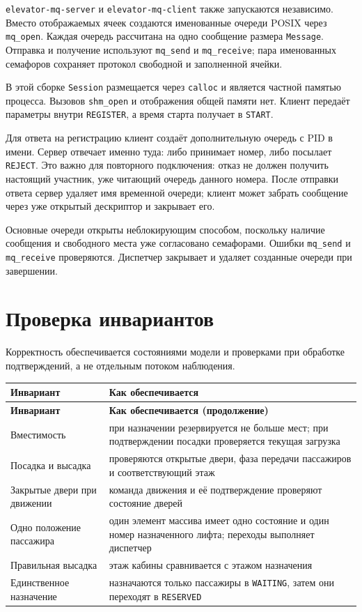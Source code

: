\documentclass[12pt,a4paper]{article}
\begin{document}
\verb|elevator-mq-server| и \verb|elevator-mq-client| также запускаются
независимо. Вместо отображаемых ячеек создаются именованные очереди
POSIX через \verb|mq_open|. Каждая очередь рассчитана на одно сообщение
размера \verb|Message|. Отправка и получение используют \verb|mq_send|
и \verb|mq_receive|; пара именованных семафоров сохраняет протокол
свободной и заполненной ячейки.

В этой сборке \verb|Session| размещается через \verb|calloc| и является
частной памятью процесса. Вызовов \verb|shm_open| и отображения общей
памяти нет. Клиент передаёт параметры внутри \verb|REGISTER|, а время
старта получает в \verb|START|.

Для ответа на регистрацию клиент создаёт дополнительную очередь с PID
в имени. Сервер отвечает именно туда: либо принимает номер, либо
посылает \verb|REJECT|. Это важно для повторного подключения: отказ не
должен получить настоящий участник, уже читающий очередь данного номера.
После отправки ответа сервер удаляет имя временной очереди; клиент
может забрать сообщение через уже открытый дескриптор и закрывает его.

Основные очереди открыты неблокирующим способом, поскольку наличие
сообщения и свободного места уже согласовано семафорами. Ошибки
\verb|mq_send| и \verb|mq_receive| проверяются. Диспетчер закрывает и
удаляет созданные очереди при завершении.

\section{Проверка инвариантов}

Корректность обеспечивается состояниями модели и проверками при
обработке подтверждений, а не отдельным потоком наблюдения.

\begin{longtable}{@{}p{48mm}p{106mm}@{}}
\textbf{Инвариант} & \textbf{Как обеспечивается} \\
\hline
\endfirsthead
\textbf{Инвариант} & \textbf{Как обеспечивается (продолжение)} \\
\hline
\endhead
Вместимость & при назначении резервируется не больше мест;
при подтверждении посадки проверяется текущая загрузка \\
Посадка и высадка & проверяются открытые двери, фаза передачи
пассажиров и соответствующий этаж \\
Закрытые двери при движении & команда движения и её подтверждение
проверяют состояние дверей \\
Одно положение пассажира & один элемент массива имеет одно состояние
и один номер назначенного лифта; переходы выполняет диспетчер \\
Правильная высадка & этаж кабины сравнивается с этажом назначения \\
Единственное назначение & назначаются только пассажиры в
\verb|WAITING|, затем они переходят в \verb|RESERVED| \\
\hline
\end{longtable}
\end{document}
